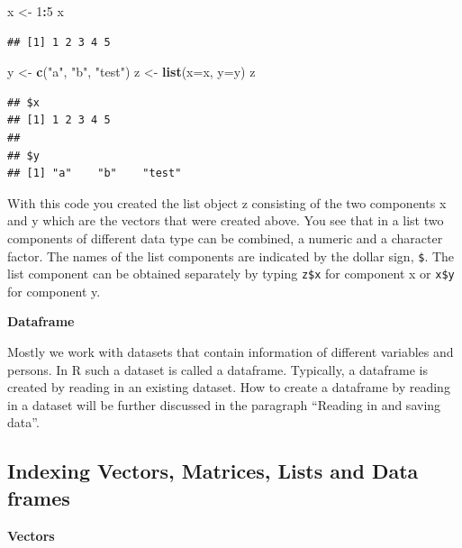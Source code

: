 \documentclass[
]{book}
\newenvironment{Shaded}{\begin{snugshade}}{\end{snugshade}}
\newcommand{\DataTypeTok}[1]{\textcolor[rgb]{0.13,0.29,0.53}{#1}}
\newcommand{\DecValTok}[1]{\textcolor[rgb]{0.00,0.00,0.81}{#1}}
\newcommand{\KeywordTok}[1]{\textcolor[rgb]{0.13,0.29,0.53}{\textbf{#1}}}
\newcommand{\NormalTok}[1]{#1}
\newcommand{\OperatorTok}[1]{\textcolor[rgb]{0.81,0.36,0.00}{\textbf{#1}}}
\newcommand{\StringTok}[1]{\textcolor[rgb]{0.31,0.60,0.02}{#1}}
\begin{document}
\begin{Shaded}
\begin{Highlighting}[]
\NormalTok{x <-}\StringTok{ }\DecValTok{1}\OperatorTok{:}\DecValTok{5}
\NormalTok{x}
\end{Highlighting}
\end{Shaded}

\begin{verbatim}
## [1] 1 2 3 4 5
\end{verbatim}

\begin{Shaded}
\begin{Highlighting}[]
\NormalTok{y <-}\StringTok{ }\KeywordTok{c}\NormalTok{(}\StringTok{"a"}\NormalTok{, }\StringTok{"b"}\NormalTok{, }\StringTok{"test"}\NormalTok{)}
\NormalTok{z <-}\StringTok{ }\KeywordTok{list}\NormalTok{(}\DataTypeTok{x=}\NormalTok{x, }\DataTypeTok{y=}\NormalTok{y)}
\NormalTok{z}
\end{Highlighting}
\end{Shaded}

\begin{verbatim}
## $x
## [1] 1 2 3 4 5
## 
## $y
## [1] "a"    "b"    "test"
\end{verbatim}

With this code you created the list object z consisting of the two components x and y which are the vectors that were created above. You see that in a list two components of different data type can be combined, a numeric and a character factor. The names of the list components are indicated by the dollar sign, \texttt{\$}. The list component can be obtained separately by typing \texttt{z\$x} for component x or \texttt{x\$y} for component y.

\textbf{Dataframe}

Mostly we work with datasets that contain information of different variables and persons. In R such a dataset is called a dataframe. Typically, a dataframe is created by reading in an existing dataset. How to create a dataframe by reading in a dataset will be further discussed in the paragraph ``Reading in and saving data''.

\hypertarget{indexing-vectors-matrices-lists-and-data-frames}{%
\subsection{Indexing Vectors, Matrices, Lists and Data frames}\label{indexing-vectors-matrices-lists-and-data-frames}}

\textbf{Vectors}
\end{document}
